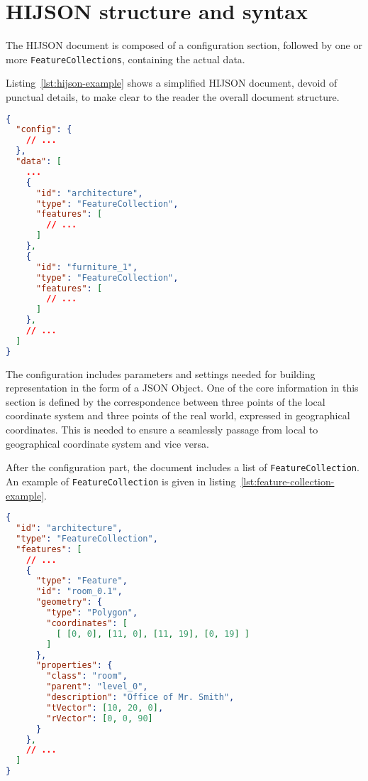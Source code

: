 
\section{HIJSON structure and syntax}\label{hijson-syntax}

The HIJSON document is composed of a configuration section, followed by one or more {\tt FeatureCollections}, containing the actual data.

Listing~\ref{lst:hijson-example} shows a simplified HIJSON document, devoid of punctual details, to make clear to the reader the overall document structure.


\begin{lstlisting}[language=json, label={lst:hijson-example}, captionpos=b, caption=Example of HIJSON document.]
{
  "config": {
    // ...
  },
  "data": [
    ...
    {
      "id": "architecture",
      "type": "FeatureCollection",
      "features": [
        // ...
      ] 
    },
    {
      "id": "furniture_1",
      "type": "FeatureCollection",
      "features": [
        // ...
      ] 
    },
    // ...
  ]
}
\end{lstlisting}


The configuration includes parameters and settings needed for building representation in the form of a JSON Object. One of the core information in this section is defined by the correspondence between three points of the local coordinate system and three points of the real world, expressed in geographical coordinates. This is needed to ensure a seamlessly passage from local to geographical coordinate system and vice versa.

After the configuration part, the document includes a list of {\tt FeatureCollection}. An example
of {\tt FeatureCollection} is given in listing~\ref{lst:feature-collection-example}.


\begin{lstlisting}[language=json, label={lst:feature-collection-example}, captionpos=b,  caption=Example of {\tt FeatureCollection}.]
{
  "id": "architecture",
  "type": "FeatureCollection",
  "features": [
    // ...
    {
      "type": "Feature",
      "id": "room_0.1",
      "geometry": {
        "type": "Polygon",
        "coordinates": [
          [ [0, 0], [11, 0], [11, 19], [0, 19] ]
        ]
      },
      "properties": {
        "class": "room",
        "parent": "level_0",
        "description": "Office of Mr. Smith",
        "tVector": [10, 20, 0],
        "rVector": [0, 0, 90]
      }
    },
    // ...
  ]
}
\end{lstlisting}

